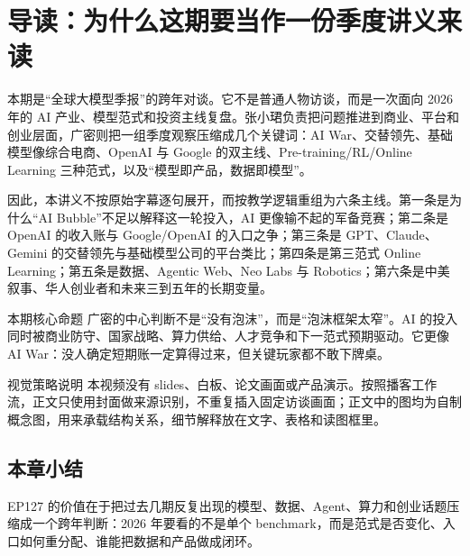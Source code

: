 \section{导读：为什么这期要当作一份季度讲义来读}

本期是“全球大模型季报”的跨年对谈。它不是普通人物访谈，而是一次面向 2026 年的 AI 产业、模型范式和投资主线复盘。张小珺负责把问题推进到商业、平台和创业层面，广密则把一组季度观察压缩成几个关键词：AI War、交替领先、基础模型像综合电商、OpenAI 与 Google 的双主线、Pre-training/RL/Online Learning 三种范式，以及“模型即产品，数据即模型”。

因此，本讲义不按原始字幕逐句展开，而按教学逻辑重组为六条主线。第一条是为什么“AI Bubble”不足以解释这一轮投入，AI 更像输不起的军备竞赛；第二条是 OpenAI 的收入账与 Google/OpenAI 的入口之争；第三条是 GPT、Claude、Gemini 的交替领先与基础模型公司的平台类比；第四条是第三范式 Online Learning；第五条是数据、Agentic Web、Neo Labs 与 Robotics；第六条是中美叙事、华人创业者和未来三到五年的长期变量。

\begin{importantbox}{本期核心命题}
广密的中心判断不是“没有泡沫”，而是“泡沫框架太窄”。AI 的投入同时被商业防守、国家战略、算力供给、人才竞争和下一范式预期驱动。它更像 AI War：没人确定短期账一定算得过来，但关键玩家都不敢下牌桌。
\end{importantbox}

\begin{knowledgebox}{视觉策略说明}
本视频没有 slides、白板、论文画面或产品演示。按照播客工作流，正文只使用封面做来源识别，不重复插入固定访谈画面；正文中的图均为自制概念图，用来承载结构关系，细节解释放在文字、表格和读图框里。
\end{knowledgebox}

\subsection{本章小结}

EP127 的价值在于把过去几期反复出现的模型、数据、Agent、算力和创业话题压缩成一个跨年判断：2026 年要看的不是单个 benchmark，而是范式是否变化、入口如何重分配、谁能把数据和产品做成闭环。

